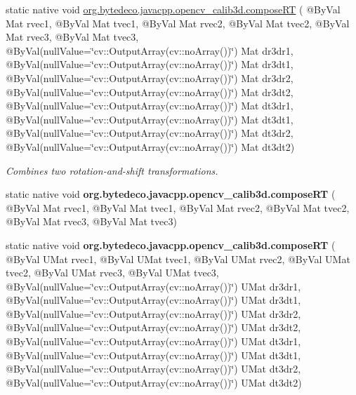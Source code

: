 \begin{DoxyCompactItemize}
static native void \hyperlink{group__calib3d_ga04fb0a4a5daa37377b0aa4b4ed2d6774}{org.\+bytedeco.\+javacpp.\+opencv\+\_\+calib3d.\+compose\+RT} ( @By\+Val Mat rvec1, @By\+Val Mat tvec1, @By\+Val Mat rvec2, @By\+Val Mat tvec2, @By\+Val Mat rvec3, @By\+Val Mat tvec3, @By\+Val(null\+Value=\char`\"{}cv\+::\+Output\+Array(cv\+::no\+Array())\char`\"{}) Mat dr3dr1, @By\+Val(null\+Value=\char`\"{}cv\+::\+Output\+Array(cv\+::no\+Array())\char`\"{}) Mat dr3dt1, @By\+Val(null\+Value=\char`\"{}cv\+::\+Output\+Array(cv\+::no\+Array())\char`\"{}) Mat dr3dr2, @By\+Val(null\+Value=\char`\"{}cv\+::\+Output\+Array(cv\+::no\+Array())\char`\"{}) Mat dr3dt2, @By\+Val(null\+Value=\char`\"{}cv\+::\+Output\+Array(cv\+::no\+Array())\char`\"{}) Mat dt3dr1, @By\+Val(null\+Value=\char`\"{}cv\+::\+Output\+Array(cv\+::no\+Array())\char`\"{}) Mat dt3dt1, @By\+Val(null\+Value=\char`\"{}cv\+::\+Output\+Array(cv\+::no\+Array())\char`\"{}) Mat dt3dr2, @By\+Val(null\+Value=\char`\"{}cv\+::\+Output\+Array(cv\+::no\+Array())\char`\"{}) Mat dt3dt2)
\begin{DoxyCompactList}\small\item\em Combines two rotation-\/and-\/shift transformations. \end{DoxyCompactList}\item 
\mbox{\label{group__calib3d_gabfac62e187f6f39ad8129e3f08a62b58}} 
static native void {\bfseries org.\+bytedeco.\+javacpp.\+opencv\+\_\+calib3d.\+compose\+RT} ( @By\+Val Mat rvec1, @By\+Val Mat tvec1, @By\+Val Mat rvec2, @By\+Val Mat tvec2, @By\+Val Mat rvec3, @By\+Val Mat tvec3)
\item 
\mbox{\label{group__calib3d_ga6bc0504368f8674f6b0134145a48d666}} 
static native void {\bfseries org.\+bytedeco.\+javacpp.\+opencv\+\_\+calib3d.\+compose\+RT} ( @By\+Val U\+Mat rvec1, @By\+Val U\+Mat tvec1, @By\+Val U\+Mat rvec2, @By\+Val U\+Mat tvec2, @By\+Val U\+Mat rvec3, @By\+Val U\+Mat tvec3, @By\+Val(null\+Value=\char`\"{}cv\+::\+Output\+Array(cv\+::no\+Array())\char`\"{}) U\+Mat dr3dr1, @By\+Val(null\+Value=\char`\"{}cv\+::\+Output\+Array(cv\+::no\+Array())\char`\"{}) U\+Mat dr3dt1, @By\+Val(null\+Value=\char`\"{}cv\+::\+Output\+Array(cv\+::no\+Array())\char`\"{}) U\+Mat dr3dr2, @By\+Val(null\+Value=\char`\"{}cv\+::\+Output\+Array(cv\+::no\+Array())\char`\"{}) U\+Mat dr3dt2, @By\+Val(null\+Value=\char`\"{}cv\+::\+Output\+Array(cv\+::no\+Array())\char`\"{}) U\+Mat dt3dr1, @By\+Val(null\+Value=\char`\"{}cv\+::\+Output\+Array(cv\+::no\+Array())\char`\"{}) U\+Mat dt3dt1, @By\+Val(null\+Value=\char`\"{}cv\+::\+Output\+Array(cv\+::no\+Array())\char`\"{}) U\+Mat dt3dr2, @By\+Val(null\+Value=\char`\"{}cv\+::\+Output\+Array(cv\+::no\+Array())\char`\"{}) U\+Mat dt3dt2)

\end{DoxyCompactItemize}
